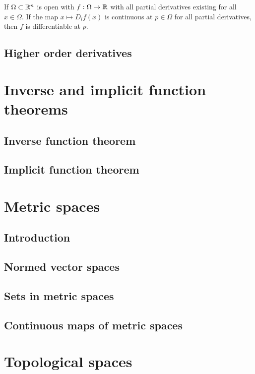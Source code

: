 \documentclass[../Year2.tex]{subfiles}
\begin{document}
\begin{theorem}
    If $\Omega\subset\mathbb{R}^n$ is open with $f:\Omega\rightarrow\mathbb{R}$ with all partial derivatives existing for all $x\in\Omega$. If the map $x\mapsto D_i f(x)$ is continuous at $p\in\Omega$ for all partial derivatives, then $f$ is differentiable at $p$.
\end{theorem}

\subsection{Higher order derivatives}

\section{Inverse and implicit function theorems}

\subsection{Inverse function theorem}

\subsection{Implicit function theorem}

\section{Metric spaces}

\subsection{Introduction}

\subsection{Normed vector spaces}

\subsection{Sets in metric spaces}

\subsection{Continuous maps of metric spaces}

\section{Topological spaces}
\end{document}
